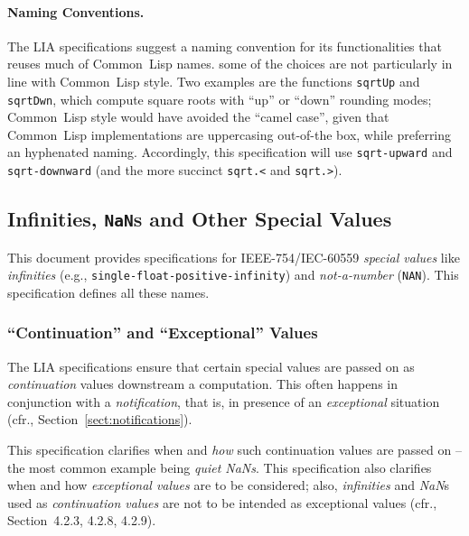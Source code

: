 \documentclass[10pt,fleqn]{article}
\newcommand{\CL}{\textsf{Common~Lisp}}
\newcommand{\code}[1]{\texttt{#1}}
\newcommand{\clieeeterm}[1]{\textit{#1}}
\newcommand{\IEEEFPStd}{IEEE-754}
\newcommand{\IECFPStd}{IEC-60559}
\begin{document}
\paragraph{Naming Conventions.}
%
The LIA specifications suggest a naming convention for its
functionalities that reuses much of \CL{} names.  some of the choices
are not particularly in line with \CL{} style.  Two examples are the
functions \code{sqrtUp} and \code{sqrtDwn}, which compute square roots
with ``up'' or ``down'' rounding modes; \CL{} style would have avoided
the ``camel case'', given that \CL{} implementations are uppercasing
out-of-the box, while preferring an hyphenated naming.  Accordingly,
this specification will use \code{sqrt-upward} and
\code{sqrt-downward} (and the more succinct \code{sqrt.<} and \code{sqrt.>}).




\subsection{Infinities, \code{NaN}s and Other Special Values}

This document provides specifications for \IEEEFPStd{}/\IECFPStd{}
\emph{special values} like \emph{infinities} (e.g.,
\code{single-float-positive-infinity}) and \emph{not-a-number}
(\code{NAN}).  This specification defines all these names.

\subsubsection{``Continuation'' and ``Exceptional'' Values}

The LIA specifications ensure that certain special values are passed
on as \emph{continuation} values downstream a computation.  This often
happens in conjunction with a \emph{notification}, that is, in
presence of an \emph{exceptional} situation (cfr.,
Section~\ref{sect:notifications}).

This specification clarifies when and \emph{how} such continuation
values are passed on -- the most common example being
\clieeeterm{quiet NaNs}.  This specification also clarifies when and
how \emph{exceptional values} are to be considered; also,
\clieeeterm{infinities} and \clieeeterm{NaN}s used as
\emph{continuation values} are not to be intended as exceptional
values (cfr., \cite{2012:LIA1} Section~4.2.3, 4.2.8, 4.2.9).
\end{document}
